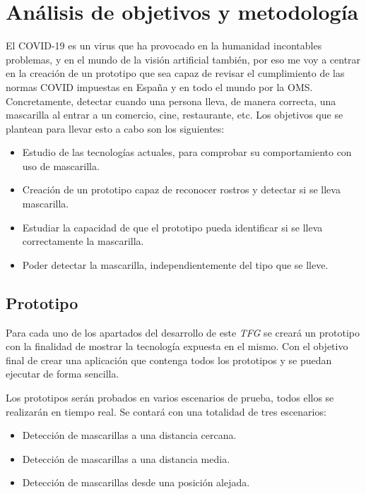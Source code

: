 
\lstset{frame=single,basicstyle=\ttfamily\small}

\chapter{Análisis de objetivos y metodología}

El COVID-19 es un virus que ha provocado en la humanidad incontables problemas, y en el mundo de la visión artificial también, por eso me voy a centrar en la creación de un prototipo que sea capaz de revisar el cumplimiento de las normas COVID impuestas en España y en todo el mundo por la OMS. Concretamente, detectar cuando una persona lleva, de manera correcta, una mascarilla al entrar a un comercio, cine, restaurante, etc. Los objetivos que se plantean para llevar esto a cabo son los siguientes:

\begin{itemize}
	\item Estudio de las tecnologías actuales, para comprobar su comportamiento con uso de mascarilla.
	\item Creación de un prototipo capaz de reconocer rostros y detectar si se lleva mascarilla.
	\item Estudiar la capacidad de que el prototipo pueda identificar si se lleva correctamente la mascarilla. 
	\item Poder detectar la mascarilla, independientemente del tipo que se lleve.
\end{itemize}

\section{Prototipo}

Para cada uno de los apartados del desarrollo de este \textit{TFG} se creará un prototipo con la finalidad de mostrar la tecnología expuesta en el mismo. Con el objetivo final de crear una aplicación que contenga todos los prototipos y se puedan ejecutar de forma sencilla. 

Los prototipos serán probados en varios escenarios de prueba, todos ellos se realizarán en tiempo real. Se contará con una totalidad de tres escenarios:

\begin{itemize}
	\item Detección de mascarillas a una distancia cercana.
	\item Detección de mascarillas a una distancia media.
	\item Detección de mascarillas desde una posición alejada.
\end{itemize}

